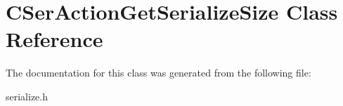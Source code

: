 \hypertarget{class_c_ser_action_get_serialize_size}{}\section{C\+Ser\+Action\+Get\+Serialize\+Size Class Reference}
\label{class_c_ser_action_get_serialize_size}


The documentation for this class was generated from the following file\+:\begin{DoxyCompactItemize}
\item 
serialize.\+h\end{DoxyCompactItemize}
